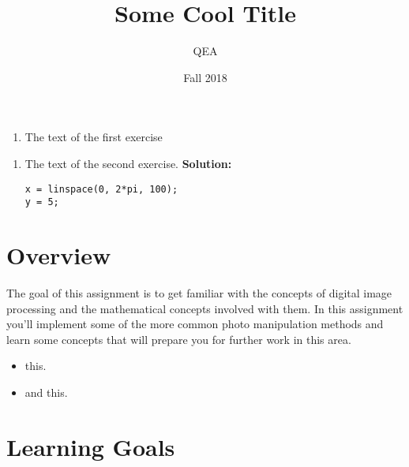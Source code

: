 \documentclass{tufte-handout}
\title{Some Cool Title}
\author{QEA}
\date{Fall 2018}
\begin{document}
\maketitle
\thispagestyle{firstpage}

\begin{enumerate}[series=exercises, label=\textbf{Exercise} (\arabic*)]
\item The text of the first exercise
\end{enumerate}
\begin{enumerate}[resume=exercises, label=\textbf{Exercise} (\arabic*)]
\item The text of the second exercise.
\textbf{Solution:}
\begin{lstlisting}
x = linspace(0, 2*pi, 100);
y = 5;
\end{lstlisting}
\fi
\end{enumerate}

\section{Overview}
The goal of this assignment is to get familiar with the concepts of digital image processing and the mathematical concepts involved with them. In this assignment you'll implement some of the more common photo manipulation methods and learn some concepts that will prepare you for further work in this area.
\begin{itemize}
\item this.
\item and this.
\end{itemize}

\section{Learning Goals}
\end{document}
